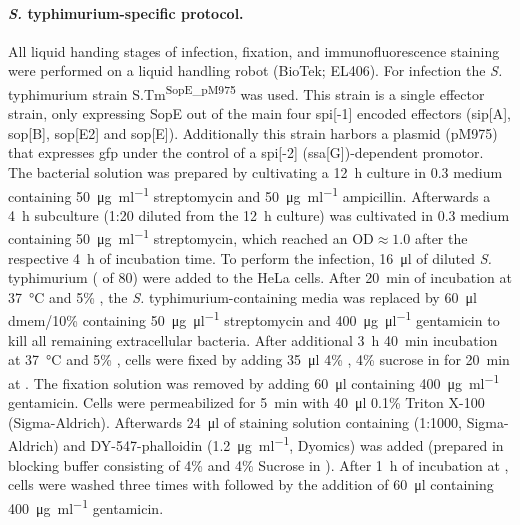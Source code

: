 \paragraph{\textit{S.} typhimurium-specific protocol.}
All liquid handing stages of infection, fixation, and immunofluorescence staining were performed on a liquid handling robot (BioTek; EL406). For infection the \textit{S.} typhimurium strain S.Tm\textsuperscript{SopE\_pM975} was used. This strain is a single effector strain, only expressing SopE out of the main four \acrshort{spi}[-1] encoded effectors (\acrshort{sip}[A], \acrshort{sop}[B], \acrshort{sop}[E2] and \acrshort{sop}[E]). Additionally this strain harbors a plasmid (pM975) that expresses \acrshort{gfp} under the control of a \acrshort{spi}[-2] (\acrshort{ssa}[G])-dependent promotor. The bacterial solution was prepared by cultivating a \SI{12}{\hour} culture in \SI{0.3}{\Molar}  medium containing \SI{50}{\micro\gram\per\milli\litre} streptomycin and \SI{50}{\micro\gram\per\milli\litre} ampicillin. Afterwards a \SI{4}{\hour} subculture (1:20 diluted from the \SI{12}{\hour} culture) was cultivated in \SI{0.3}{\Molar}  medium containing \SI{50}{\micro\gram\per\milli\litre} streptomycin, which reached an OD$\approx1.0$ after the respective \SI{4}{\hour} of incubation time. To perform the infection, \SI{16}{\micro\litre} of diluted \textit{S.} typhimurium ( of 80) were added to the HeLa cells. After \SI{20}{\minute} of incubation at \SI{37}{\celsius} and 5\% , the \textit{S.} typhimurium-containing media was replaced by \SI{60}{\micro\litre} \acrshort{dmem}\slash 10\%  containing \SI{50}{\micro\gram\per\micro\litre} streptomycin and \SI{400}{\micro\gram\per\micro\litre} gentamicin to kill all remaining extracellular bacteria. After additional \SI{3}{\hour} \SI{40}{\minute} incubation at \SI{37}{\celsius} and 5\% , cells were fixed by adding \SI{35}{\micro\litre} 4\% , 4\% sucrose in  for \SI{20}{\minute} at . The fixation solution was removed by adding \SI{60}{\micro\litre}  containing \SI{400}{\micro\gram\per\milli\litre} gentamicin. Cells were permeabilized for \SI{5}{\minute} with \SI{40}{\micro\litre} 0.1\% Triton X-100 (Sigma-Aldrich). Afterwards \SI{24}{\micro\litre} of staining solution containing  (1:1000, Sigma-Aldrich) and DY-547-phalloidin (\SI{1.2}{\micro\gram\per\milli\litre}, Dyomics) was added (prepared in blocking buffer consisting of 4\%  and 4\% Sucrose in ). After \SI{1}{\hour} of incubation at , cells were washed three times with  followed by the addition of \SI{60}{\micro\litre}  containing \SI{400}{\micro\gram\per\milli\litre} gentamicin.

